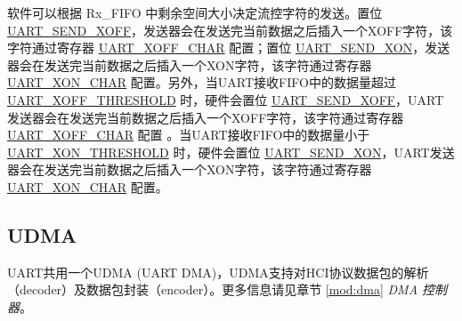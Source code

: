 \documentclass[main\_\_CN.tex]{subfiles}
\begin{document}
软件可以根据 Rx\_FIFO 中剩余空间大小决定流控字符的发送。置位 \hyperref[fielddesc:UARTSENDXOFF]{UART\_SEND\_XOFF}，发送器会在发送完当前数据之后插入一个XOFF字符，该字符通过寄存器 \hyperref[fielddesc:UARTXOFFCHAR]{UART\_XOFF\_CHAR} 配置；置位 \hyperref[fielddesc:UARTSENDXON]{UART\_SEND\_XON}，发送器会在发送完当前数据之后插入一个XON字符，该字符通过寄存器  \hyperref[fielddesc:UARTXONCHAR]{UART\_XON\_CHAR} 配置。另外，当UART接收FIFO中的数据量超过 \hyperref[fielddesc:UARTXOFFTHRESHOLD]{UART\_XOFF\_THRESHOLD} 时，硬件会置位 \hyperref[fielddesc:UARTSENDXOFF]{UART\_SEND\_XOFF}，UART发送器会在发送完当前数据之后插入一个XOFF字符，该字符通过寄存器 \hyperref[fielddesc:UARTXOFFCHAR]{UART\_XOFF\_CHAR} 配置 。当UART接收FIFO中的数据量小于 \hyperref[fielddesc:UARTXONTHRESHOLD]{UART\_XON\_THRESHOLD} 时，硬件会置位 \hyperref[fielddesc:UARTSENDXON]{UART\_SEND\_XON}，UART发送器会在发送完当前数据之后插入一个XON字符，该字符通过寄存器 \hyperref[fielddesc:UARTXONCHAR]{UART\_XON\_CHAR} 配置。

\subsection{UDMA}

UART共用一个UDMA (UART DMA)，UDMA支持对HCI协议数据包的解析（decoder）及数据包封装（encoder）。更多信息请见章节 \ref{mod:dma} \textit{DMA 控制器}。
\end{document}
